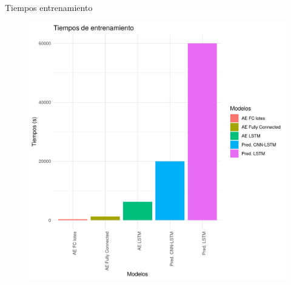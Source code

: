 \documentclass[10pt]{beamer}
\begin{document}
\begin{frame}[fragile]{Tiempos entrenamiento}
	\vspace{10px}
	\pause
	
	\begin{figure}[H]
		\centering
		\includegraphics[scale=0.43]{Imagenes/tiempos_entrenamiento.png}
	\end{figure}
	
\end{frame}
\end{document}
